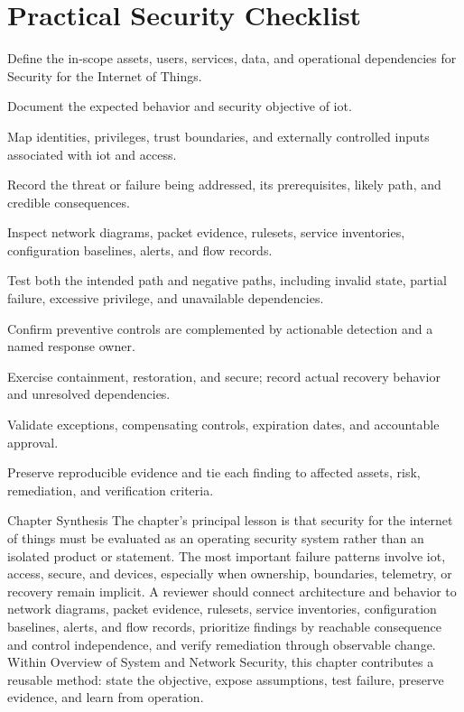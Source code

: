 \documentclass[11pt,letterpaper]{article}
\begin{document}
\section*{Practical Security Checklist}
\begin{CornellChecklist}
\item Define the in-scope assets, users, services, data, and operational dependencies for Security for the Internet of Things.
\item Document the expected behavior and security objective of iot.
\item Map identities, privileges, trust boundaries, and externally controlled inputs associated with iot and access.
\item Record the threat or failure being addressed, its prerequisites, likely path, and credible consequences.
\item Inspect network diagrams, packet evidence, rulesets, service inventories, configuration baselines, alerts, and flow records.
\item Test both the intended path and negative paths, including invalid state, partial failure, excessive privilege, and unavailable dependencies.
\item Confirm preventive controls are complemented by actionable detection and a named response owner.
\item Exercise containment, restoration, and secure; record actual recovery behavior and unresolved dependencies.
\item Validate exceptions, compensating controls, expiration dates, and accountable approval.
\item Preserve reproducible evidence and tie each finding to affected assets, risk, remediation, and verification criteria.
\end{CornellChecklist}
\begin{CornellSummaryBox}{Chapter Synthesis}
The chapter's principal lesson is that security for the internet of things must be evaluated as an operating security system rather than an isolated product or statement. The most important failure patterns involve iot, access, secure, and devices, especially when ownership, boundaries, telemetry, or recovery remain implicit. A reviewer should connect architecture and behavior to network diagrams, packet evidence, rulesets, service inventories, configuration baselines, alerts, and flow records, prioritize findings by reachable consequence and control independence, and verify remediation through observable change. Within Overview of System and Network Security, this chapter contributes a reusable method: state the objective, expose assumptions, test failure, preserve evidence, and learn from operation.
\end{CornellSummaryBox}
\end{document}
